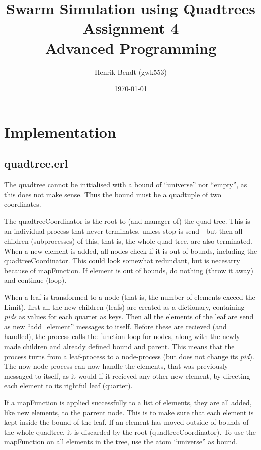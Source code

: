 \documentclass[a4paper, 10pt]{article}
\author{Henrik Bendt (gwk553)}
\title{Swarm Simulation using Quadtrees\\Assignment 4\\Advanced Programming}
\date{\today}
\begin{document}
\maketitle
\pagebreak

\section*{Implementation}
\subsection*{quadtree.erl}
The quadtree cannot be initialised with a bound of ``universe'' nor ``empty'', as this does not make sense. Thus the bound must be a quadtuple of two coordinates.

The quadtreeCoordinator is the root to (and manager of) the quad tree. This is an individual process that never terminates, unless stop is send - but then all children (subprocesses) of this, that is, the whole quad tree, are also terminated.
When a new element is added, all nodes check if it is out of bounds, including the quadtreeCoordinator. This could look somewhat redundant, but is necesarry because of mapFunction. 
If element is out of bounds, do nothing (throw it away) and continue (loop).

When a leaf is transformed to a node (that is, the number of elements exceed the Limit), first all the new children (leafs) are created as a dictionary, containing \textit{pids} as values for each quarter as keys. Then all the elements of the leaf are send as new ``add\_element'' messages to itself. Before these are recieved (and handled), the process calls the function-loop for nodes, along with the newly made children and already defined bound and parent. This means that the process turns from a leaf-process to a node-process (but does not change its \textit{pid}). The now-node-process can now handle the elements, that was previously messaged to itself, as it would if it recieved any other new element, by directing each element to its rightful leaf (quarter).

If a mapFunction is applied successfully to a list of elements, they are all added, like new elements, to the parrent node. This is to make sure that each element is kept inside the bound of the leaf. If an element has moved outside of bounds of the whole quadtree, it is discarded by the root (quadtreeCoordinator). To use the mapFunction on all elements in the tree, use the atom ``universe'' as bound.
\end{document}
